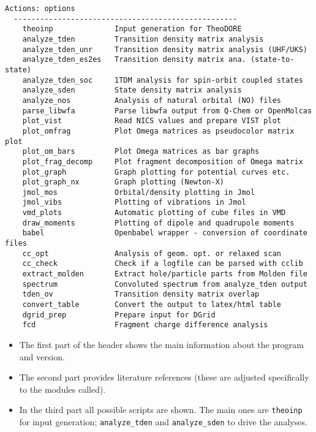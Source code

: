 \documentclass[DIV=12,headings=normal]{scrartcl}
\begin{document}
\begin{Verbatim}[commandchars=\\\{\}]
  Actions: options
  ---------------------------------------------------
    theoinp              Input generation for TheoDORE                     
    analyze_tden         Transition density matrix analysis                
    analyze_tden_unr     Transition density matrix analysis (UHF/UKS)      
    analyze_tden_es2es   Transition density matrix ana. (state-to-state)   
    analyze_tden_soc     1TDM analysis for spin-orbit coupled states       
    analyze_sden         State density matrix analysis                     
    analyze_nos          Analysis of natural orbital (NO) files            
    parse_libwfa         Parse libwfa output from Q-Chem or OpenMolcas     
    plot_vist            Read NICS values and prepare VIST plot            
    plot_omfrag          Plot Omega matrices as pseudocolor matrix plot    
    plot_om_bars         Plot Omega matrices as bar graphs                 
    plot_frag_decomp     Plot fragment decomposition of Omega matrix       
    plot_graph           Graph plotting for potential curves etc.          
    plot_graph_nx        Graph plotting (Newton-X)                         
    jmol_mos             Orbital/density plotting in Jmol                  
    jmol_vibs            Plotting of vibrations in Jmol                    
    vmd_plots            Automatic plotting of cube files in VMD           
    draw_moments         Plotting of dipole and quadrupole moments         
    babel                Openbabel wrapper - conversion of coordinate files
    cc_opt               Analysis of geom. opt. or relaxed scan            
    cc_check             Check if a logfile can be parsed with cclib       
    extract_molden       Extract hole/particle parts from Molden file      
    spectrum             Convoluted spectrum from analyze_tden output      
    tden_ov              Transition density matrix overlap                 
    convert_table        Convert the output to latex/html table            
    dgrid_prep           Prepare input for DGrid                           
    fcd                  Fragment charge difference analysis     
\end{Verbatim}
\normalsize

\begin{itemize}
\item The first part of the header shows the main information about the program and version.
\item The second part provides literature references (these are adjusted specifically to the modules called).
\item In the third part all possible scripts are shown. The main ones are \texttt{theoinp} for input generation; \texttt{analyze\_tden} and \texttt{analyze\_sden} to drive the analyses.
\end{itemize}
\end{document}
